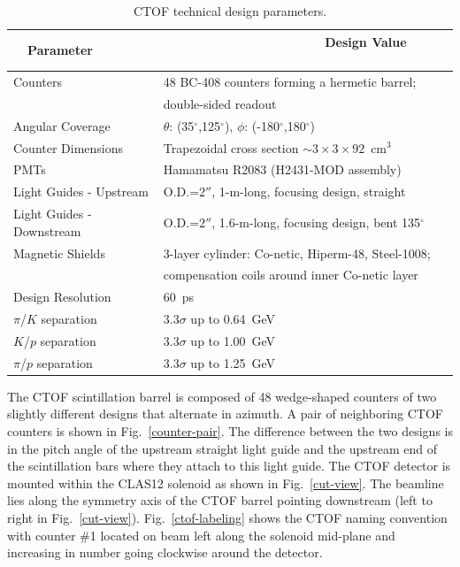 \documentclass[12pt]{article}
\begin{document}
\begin{table}[htbp]
\begin{center}
\begin{tabular} {|l|l|} \hline
~~Parameter~~ &~~~~~~~~~~~~~~~~~~~~~~ Design Value ~~~~~~~~~~\\ \hline \hline
Counters                  & 48 BC-408 counters forming a hermetic barrel; \\
                          & double-sided readout                   \\ \hline
Angular Coverage          & $\theta$: (35$^\circ$,125$^\circ$), $\phi$: (-180$^\circ$,180$^\circ$) \\ \hline
Counter Dimensions        & Trapezoidal cross section $\sim 3 \times 3 \times 92$~cm$^3$ \\ \hline
PMTs                      & Hamamatsu R2083 (H2431-MOD assembly)    \\ \hline
Light Guides - Upstream   & O.D.=$2''$, 1-m-long, focusing design, straight \\ \hline
Light Guides - Downstream & O.D.=$2''$, 1.6-m-long, focusing design, bent 135$^\circ$ \\ \hline
Magnetic Shields          & 3-layer cylinder: Co-netic, Hiperm-48, Steel-1008; \\ 
                          & compensation coils around inner Co-netic layer \\ \hline
Design Resolution         & 60~ps \\ \hline
$\pi$/$K$ separation      & 3.3$\sigma$ up to 0.64~GeV \\ \hline
$K$/$p$ separation        & 3.3$\sigma$ up to 1.00~GeV \\ \hline
$\pi$/$p$ separation      & 3.3$\sigma$ up to 1.25~GeV \\ \hline
\end{tabular}
\end{center}
\caption{CTOF technical design parameters.}
\label{details}
\end{table}

The CTOF scintillation barrel is composed of 48 wedge-shaped counters of two slightly different 
designs that alternate in azimuth. A pair of neighboring CTOF counters is shown in 
Fig.~\ref{counter-pair}. The difference between the two designs is in the pitch angle of the 
upstream straight light guide and the upstream end of the scintillation bars where they attach 
to this light guide. The CTOF detector is mounted within the CLAS12 solenoid as shown in 
Fig.~\ref{cut-view}. The beamline lies along the symmetry axis of the CTOF barrel pointing 
downstream (left to right in Fig.~\ref{cut-view}). Fig.~\ref{ctof-labeling} shows the CTOF naming 
convention with counter \#1 located on beam left along the solenoid mid-plane and increasing in 
number going clockwise around the detector.
\end{document}
